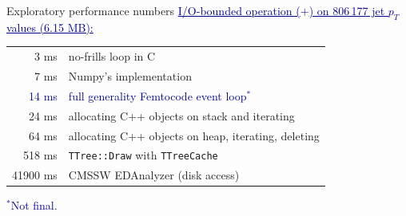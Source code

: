 \documentclass{beamer}
\begin{document}
\begin{frame}{Exploratory performance numbers}
\vspace{0.5 cm}
\textcolor{darkblue}{\underline{I/O-bounded operation ($+$) on 806\,177 jet $p_T$ values (6.15 MB):}}

\vspace{-0.4 cm}
\begin{center}
\renewcommand{\arraystretch}{1.2}
\begin{tabular}{r l}
3 ms & no-frills loop in C \\
7 ms & Numpy's implementation \\
\textcolor{darkblue}{14 ms} & \textcolor{darkblue}{full generality Femtocode event loop$^*$} \\
24 ms & allocating C++ objects on stack and iterating \\
64 ms & allocating C++ objects on heap, iterating, deleting \\
518 ms & {\tt TTree::Draw} with {\tt TTreeCache} \\
41900 ms & CMSSW EDAnalyzer (disk access)
\end{tabular}
\end{center}

\vspace{0.5 cm}
\textcolor{darkblue}{$^*$Not final.}
\end{frame}
\end{document}
